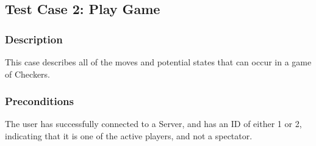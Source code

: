 \documentclass[letterpaper]{article}
\begin{document}
\subsection{Test Case 2: Play Game}
\label{sec:test_play}

\subsubsection{Description}
\label{sec:test_play_des}
This case describes all of the moves and potential states that can occur in a 
game of Checkers.

\subsubsection{Preconditions}
\label{sec:test_play_precon}
The user has successfully connected to a Server, and has an ID of either 1 or
2, indicating that it is one of the active players, and not a spectator.
\end{document}

